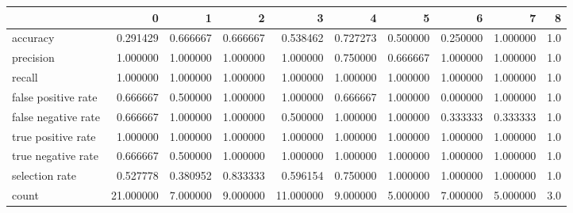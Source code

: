 \begin{tabular}{lrrrrrrrrr}
\toprule
{} &          0 &         1 &         2 &          3 &         4 &         5 &         6 &         7 &    8 \\
\midrule
accuracy            &   0.291429 &  0.666667 &  0.666667 &   0.538462 &  0.727273 &  0.500000 &  0.250000 &  1.000000 &  1.0 \\
precision           &   1.000000 &  1.000000 &  1.000000 &   1.000000 &  0.750000 &  0.666667 &  1.000000 &  1.000000 &  1.0 \\
recall              &   1.000000 &  1.000000 &  1.000000 &   1.000000 &  1.000000 &  1.000000 &  1.000000 &  1.000000 &  1.0 \\
false positive rate &   0.666667 &  0.500000 &  1.000000 &   1.000000 &  0.666667 &  1.000000 &  0.000000 &  1.000000 &  1.0 \\
false negative rate &   0.666667 &  1.000000 &  1.000000 &   0.500000 &  1.000000 &  1.000000 &  0.333333 &  0.333333 &  1.0 \\
true positive rate  &   1.000000 &  1.000000 &  1.000000 &   1.000000 &  1.000000 &  1.000000 &  1.000000 &  1.000000 &  1.0 \\
true negative rate  &   0.666667 &  0.500000 &  1.000000 &   1.000000 &  1.000000 &  1.000000 &  1.000000 &  1.000000 &  1.0 \\
selection rate      &   0.527778 &  0.380952 &  0.833333 &   0.596154 &  0.750000 &  1.000000 &  1.000000 &  1.000000 &  1.0 \\
count               &  21.000000 &  7.000000 &  9.000000 &  11.000000 &  9.000000 &  5.000000 &  7.000000 &  5.000000 &  3.0 \\
\bottomrule
\end{tabular}
